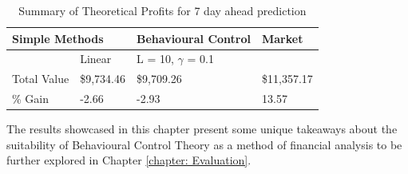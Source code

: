 \begin{table}[h]
    \begin{center}
        \begin{tabular}{llll|l|l}
            \hline
            \multicolumn{4}{l|}{Simple Methods}               & Behavioural Control                 & Market      \\ \hline
            \multicolumn{3}{l|}{}            & Linear         & L = 10, $\gamma$ = 0.1 &             \\ \hline
            \multicolumn{3}{l|}{Total Value} & \$9,734.46     & \$9,709.26                          & \$11,357.17 \\ \hline
            \multicolumn{3}{l|}{\% Gain}     & -2.66          & -2.93                               & 13.57       \\ \hline
            \end{tabular}
    \end{center}
    \caption{Summary of Theoretical Profits for 7 day ahead prediction}
    \label{tab: Buy_sell_2}
\end{table}

\noindent The results showcased in this chapter present some unique takeaways about the suitability of Behavioural Control Theory as a method of financial analysis to be further explored in Chapter \ref{chapter: Evaluation}. 






